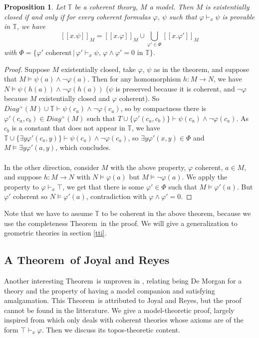 \documentclass{article}
\newtheorem{proposition}[theorem]{Proposition}
\newcommand{\T}{\mathbb{T}}
\renewcommand{\phi}{\varphi}
\begin{document}
\begin{proposition}\label{exist_closed}
    Let $\mathbb{T}$ be a coherent theory, $M$ a model. Then $M$ is existentially closed if and only if for every coherent formulas $\phi$, $\psi$ such that $\phi\vdash_x \psi$ is provable in $\mathbb{T}$, we have 
    $$[[x.\psi]]_M=[[x.\phi]]_M\cup\bigcup_{\phi'\in\Phi}[[x.\phi']]_M$$
    with $\Phi=\{\phi'\text{ coherent}\,|\,\phi'\vdash_x \psi,\,\phi\land\phi'=0\text{ in $\T$}\}$.
\end{proposition}
\begin{proof}
    Suppose $M$ existentially closed, take $\phi$, $\psi$ as in the theorem, and suppose that $M\models \psi(a)\land\neg\phi(a)$. Then for any homomorphism $h:M\xrightarrow{} N$, we have $N\models \psi(h(a))\land\neg\phi(h(a))$ ($\psi$ is preserved because it is coherent, and $\neg\phi$ because $M$ existentially closed and $\phi$ coherent). So $Diag^+(M)\cup\T\vdash\psi(c_a)\land\neg\phi(c_a)$, so by compactness there is $\phi'(c_a,c_b)\in Diag^+(M)$ such that $T\cup\{\phi'(c_a,c_b)\}\vdash\psi(c_a)\land\neg\phi(c_a)$. As $c_b$ is a constant that does not appear in $\T$, we have $\T\cup\{\exists y\phi'(c_a,y)\}\vdash\psi(c_a)\land\neg\phi(c_a)$, so $\exists y\phi'(x,y)\in\Phi$ and $M\models \exists y\phi'(a,y)$, which concludes.\\
    \\
    In the other direction, consider $M$ with the above property, $\phi$ coherent, $a\in M$, and suppose $h:M\xrightarrow{} N$ with $N\models\phi(a)$ but $M\models \neg\phi(a)$. We apply the property to $\phi\vdash_x\top$, we get that there is some $\phi'\in\Phi$ such that $M\models \phi'(a)$. But $\phi'$ coherent so $N\models \phi'(a)$, contradiction with $\phi\land\phi'=0$.
\end{proof}

Note that we have to assume $\T$ to be coherent in the above theorem, because we use the completeness Theorem~in the proof. We will give a generalization to geometric theories in section \ref{tti}.

\subsection{A Theorem~of Joyal and Reyes}
Another interesting Theorem~is unproven in \cite{harun1996applications}, relating being De Morgan for a theory and the property of having a model companion and satisfying amalgamation. This Theorem~is attributed to Joyal and Reyes, but the proof cannot be found in the litterature. We give a model-theoretic proof, largely inspired from \cite{weispfenning1981model} which only deals with coherent theories whose axioms are of the form $\top\vdash_x\phi$. Then we discuss its topos-theoretic content.
\end{document}
